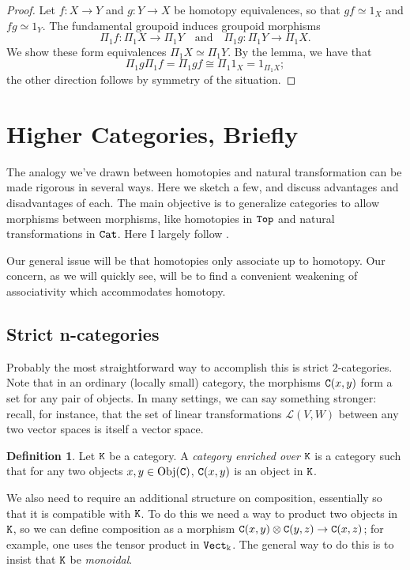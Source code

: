\documentclass[11 pt]{amsart}
\theoremstyle{plain}   %
\theoremstyle{definition}
\newtheorem{defn}{Definition}[section]
\theoremstyle{remark}
\numberwithin{equation}{section}
\def\cL{\mathcal{L}}
\newcommand{\cat}[1]{{\normalfont\texttt{#1}}}
\newcommand{\Obj}[1]{\text{Obj}(\cat{#1})}
\begin{document}
\begin{proof}
	Let $f: X\rightarrow Y$ and $g: Y\rightarrow X$ be homotopy equivalences, so
	that $gf\simeq 1_X$ and $fg\simeq 1_Y$. The fundamental groupoid induces
	groupoid morphisms $$\Pi_1f: \Pi_1X\rightarrow\Pi_1Y\quad\text{and}\quad\Pi_1g:
		\Pi_1Y\rightarrow\Pi_1X.$$
	We show these form equivalences $\Pi_1X\simeq \Pi_1Y$. By the lemma, we have
	that $$\Pi_1g\Pi_1f = \Pi_1 gf\cong \Pi_1{1_X} = 1_{\Pi_1 X};$$ the other
	direction follows by symmetry of the situation.
\end{proof}

\section{Higher Categories, Briefly}

The analogy we've drawn between homotopies and natural transformation can be
made rigorous in several ways. Here we sketch a few, and discuss advantages and
disadvantages of each. The main objective is to generalize categories to allow
morphisms between morphisms, like homotopies in $\cat{Top}$ and natural
transformations in $\cat{Cat}$. Here I largely follow \cite{Leinster}.

Our general issue will be that homotopies only associate up to homotopy. Our
concern, as we will quickly see, will be to find a convenient weakening of
associativity which accommodates homotopy.

\subsection{Strict n-categories}

Probably the most straightforward way to accomplish this is strict
$2$-categories. Note that in an ordinary (locally small) category, the morphisms
$\cat{C}(x, y)$ form a set for any pair of objects. In many settings, we can say
something stronger: recall, for instance, that the set of linear transformations
$\cL(V, W)$ between any two vector spaces is itself a vector space.

\begin{defn}
	Let $\cat{K}$ be a category. A \emph{category enriched over $\cat{K}$} is a
	category such that for any two objects $x,y\in\Obj{C}$, $\cat{C}(x, y)$ is an
	object in $\cat{K}$.
\end{defn}

We also need to require an additional structure on composition, essentially so
that it is compatible with $\cat{K}$. To do this we need a way to product two
objects in $\cat{K}$, so we can define composition as a morphism $\cat{C}(x,
	y)\otimes\cat{C}(y, z)\rightarrow\cat{C}(x, z)$; for example, one uses the
tensor product in $\cat{Vect}_\Bbbk$. The general way to do this is to insist that
$\cat{K}$ be \emph{monoidal}.
\end{document}
